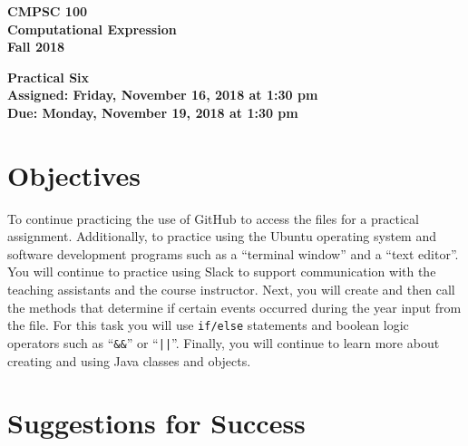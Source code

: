 \documentclass[11pt]{article}
\newcommand{\assignmentduedate}{November 19}
\newcommand{\assignmentassignedate}{November 16}
\newcommand{\assignmentnumber}{Six}
\newcommand{\labyear}{2018}
\newcommand{\labdueday}{Monday}
\newcommand{\labassignday}{Friday}
\newcommand{\labtime}{1:30 pm}
\newcommand{\assigneddate}{Assigned: \labassignday, \assignmentassignedate, \labyear{} at \labtime{}}
\newcommand{\duedate}{Due: \labdueday, \assignmentduedate, \labyear{} at \labtime{}}
\newcommand{\labtitle}[1]
{
  \begin{center}
    \begin{center}
      \bf
      CMPSC 100\\Computational Expression\\
      Fall 2018\\
      \medskip
    \end{center}
    \bf
    #1
  \end{center}
}
\begin{document}
\thispagestyle{empty}

\labtitle{Practical \assignmentnumber{} \\ \assigneddate{} \\ \duedate{}}

\section*{Objectives}

To continue practicing the use of GitHub to access the files for a practical
assignment. Additionally, to practice using the Ubuntu operating system and
software development programs such as a ``terminal window'' and a ``text
editor''. You will continue to practice using Slack to support communication
with the teaching assistants and the course instructor. Next, you will create
and then call the methods that determine if certain events occurred during the
year input from the file. For this task you will use {\tt if/else} statements
and boolean logic operators such as ``{\tt \&\&}'' or ``{\tt ||}''. Finally, you
will continue to learn more about creating and using Java classes and objects.

\section*{Suggestions for Success}
\end{document}
